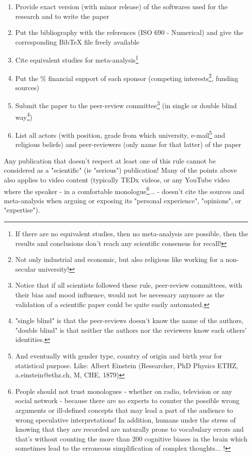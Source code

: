 \begin{enumerate}[label=\protect\circledbullet{\arabic*},leftmargin=15mm]
		\item Provide exact version (with minor release) of the softwares used for the research and to write the paper
		
		\item Put the bibliography with the references (ISO 690 - Numerical) and give the corresponding BibTeX file freely available
		
		\item Cite equivalent studies for meta-analysis\footnote{If there are no equivalent studies, then no meta-analysis are possible, then the results and conclusions don't reach any scientific consensus for recall!}
		
		\item Put the \% financial support of each sponsor (competing interests\footnote{Not only industrial and economic, but also religious like working for a non-secular university!}, funding sources)
		
		\item Submit the paper to the peer-review committee\footnote{Notice that if all scientists followed these rule, peer-review committees, with their bias and mood influence, would not be necessary anymore as the validation of a scientific paper could be quite easily automated.} (in single or double blind way\footnote{"single blind" is that the peer-reviews doesn't know the name of the authors, "double blind" is that neither the authors nor the reviewers know each others' identities.})
		
		\item List all actors (with position, grade from which university, e-mail\footnote{And eventually with gender type, country of origin and birth year for statistical purpose. Like: Albert Einstein (Researcher, PhD Physics ETHZ, a.einstein@ethz.ch, M, CHE, 1879)} and religious beliefs) and peer-reviewers (only name for that latter) of the paper
	\end{enumerate}
	Any publication that doesn't respect at least one of this rule cannot be considered as a "scientific" (ie "serious") publication! Many of the points above also applies to video content (typically TEDx videos, or any YouTube video where the speaker - in a comfortable monologue\footnote{People should not trust monologues - whether on radio, television or any social network - because there are no experts to counter the possible wrong arguments or ill-defined concepts that may lead a part of the audience to wrong speculative interpretations! In addition, humans under the stress of knowing that they are recorded are naturally prone to vocabulary errors and that's without counting the more than 200 cognitive biases in the brain which sometimes lead to the erroneous simplification of complex thoughts... !}... - doesn't cite the sources and meta-analysis when arguing or exposing its "personal experience", "opinions", or "expertise").
	
